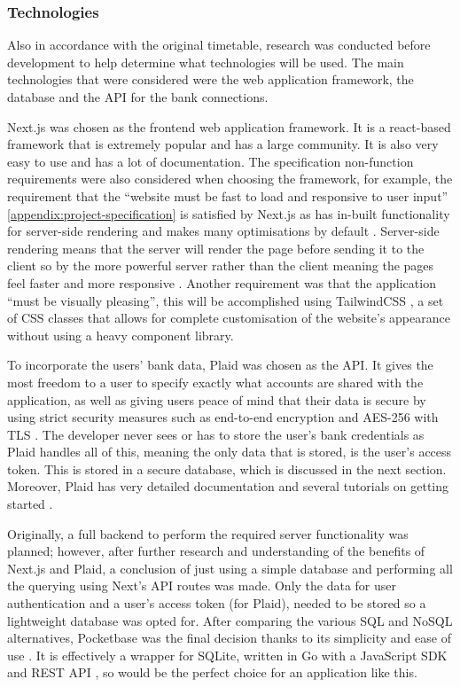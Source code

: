 \subsubsection{Technologies}
Also in accordance with the original timetable, research was conducted before development to help determine what technologies will be used. The main technologies that were considered were the web application framework, the database and the API for the bank connections.

Next.js was chosen as the frontend web application framework. It is a react-based framework that is extremely popular and has a large community. It is also very easy to use and has a lot of documentation. The specification non-function requirements were also considered when choosing the framework, for example, the requirement that the ``website must be fast to load and responsive to user input'' \ref{appendix:project-specification} is satisfied by Next.js as has in-built functionality for server-side rendering and makes many optimisations by default \cite{NextjsPerformance}. Server-side rendering means that the server will render the page before sending it to the client so by the more powerful server rather than the client meaning the pages feel faster and more responsive \cite{SSR}. Another requirement was that the application ``must be visually pleasing'', this will be accomplished using TailwindCSS \cite{TailwindCSS}, a set of CSS classes that allows for complete customisation of the website's appearance without using a heavy component library.

To incorporate the users' bank data, Plaid \cite{Plaid} was chosen as the API. It gives the most freedom to a user to specify exactly what accounts are shared with the application, as well as giving users peace of mind that their data is secure by using strict security measures such as end-to-end encryption and AES-256 with TLS \cite{Plaid}. The developer never sees or has to store the user's bank credentials as Plaid handles all of this, meaning the only data that is stored, is the user's access token. This is stored in a secure database, which is discussed in the next section. Moreover, Plaid has very detailed documentation and several tutorials on getting started \cite{PlaidGettingStarted}.

Originally, a full backend to perform the required server functionality was planned; however, after further research and understanding of the benefits of Next.js and Plaid, a conclusion of just using a simple database and performing all the querying using Next's API routes was made. Only the data for user authentication and a user's access token (for Plaid), needed to be stored so a lightweight database was opted for. After comparing the various SQL and NoSQL alternatives, Pocketbase was the final decision thanks to its simplicity and ease of use \cite{NoBackendsPocketbase}. It is effectively a wrapper for SQLite, written in Go with a JavaScript SDK and REST API \cite{PocketbaseJavaScriptSDK}, so would be the perfect choice for an application like this.

